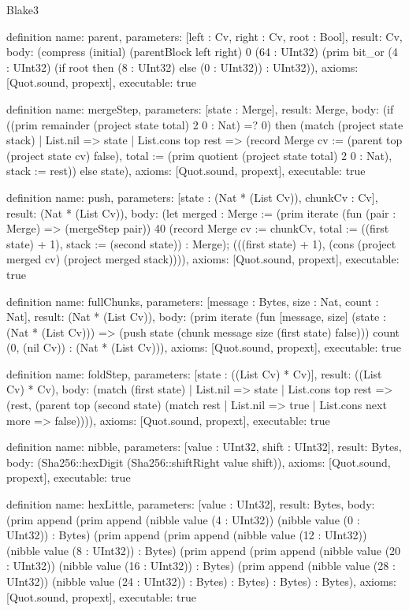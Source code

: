 \begin{lexlean}{Blake3}
\begin{semanticmodule}
definition{
  name: parent,
  parameters: [left : Cv, right : Cv, root : Bool],
  result: Cv,
  body: (compress (initial) (parentBlock left right) 0 (64 : UInt32) (prim bit_or (4 : UInt32) (if root then (8 : UInt32) else (0 : UInt32)) : UInt32)),
  axioms: [Quot.sound, propext],
  executable: true
}

definition{
  name: mergeStep,
  parameters: [state : Merge],
  result: Merge,
  body: (if ((prim remainder (project state total) 2 0 : Nat) =? 0) then (match (project state stack)
    | List.nil => state
    | List.cons top rest => (record Merge {cv := (parent top (project state cv) false), total := (prim quotient (project state total) 2 0 : Nat), stack := rest})) else state),
  axioms: [Quot.sound, propext],
  executable: true
}

definition{
  name: push,
  parameters: [state : (Nat * (List Cv)), chunkCv : Cv],
  result: (Nat * (List Cv)),
  body: (let merged : Merge := (prim iterate (fun (pair : Merge) => (mergeStep pair)) 40 (record Merge {cv := chunkCv, total := ((first state) + 1), stack := (second state)}) : Merge); (((first state) + 1), (cons (project merged cv) (project merged stack)))),
  axioms: [Quot.sound, propext],
  executable: true
}

definition{
  name: fullChunks,
  parameters: [message : Bytes, size : Nat, count : Nat],
  result: (Nat * (List Cv)),
  body: (prim iterate (fun [message, size] (state : (Nat * (List Cv))) => (push state (chunk message size (first state) false))) count (0, (nil Cv)) : (Nat * (List Cv))),
  axioms: [Quot.sound, propext],
  executable: true
}

definition{
  name: foldStep,
  parameters: [state : ((List Cv) * Cv)],
  result: ((List Cv) * Cv),
  body: (match (first state)
    | List.nil => state
    | List.cons top rest => (rest, (parent top (second state) (match rest
      | List.nil => true
      | List.cons next more => false)))),
  axioms: [Quot.sound, propext],
  executable: true
}

definition{
  name: nibble,
  parameters: [value : UInt32, shift : UInt32],
  result: Bytes,
  body: (Sha256::hexDigit (Sha256::shiftRight value shift)),
  axioms: [Quot.sound, propext],
  executable: true
}

definition{
  name: hexLittle,
  parameters: [value : UInt32],
  result: Bytes,
  body: (prim append (prim append (nibble value (4 : UInt32)) (nibble value (0 : UInt32)) : Bytes) (prim append (prim append (nibble value (12 : UInt32)) (nibble value (8 : UInt32)) : Bytes) (prim append (prim append (nibble value (20 : UInt32)) (nibble value (16 : UInt32)) : Bytes) (prim append (nibble value (28 : UInt32)) (nibble value (24 : UInt32)) : Bytes) : Bytes) : Bytes) : Bytes),
  axioms: [Quot.sound, propext],
  executable: true
}


\end{semanticmodule}
\end{lexlean}
